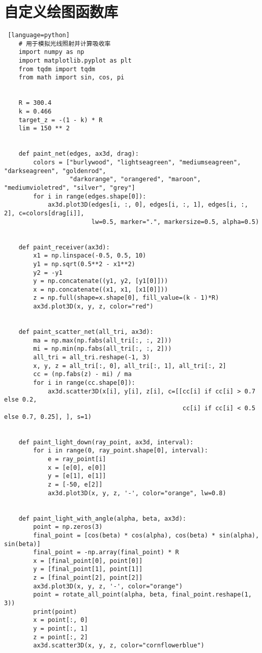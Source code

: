 \documentclass[withoutpreface,bwprint,fontset=macnew]{cumcmthesis} %
\begin{document}
\begin{appendices}
\begin{lstlisting}[language=python]
	\end{lstlisting}
	\section{自定义绘图函数库}
	\begin{lstlisting} [language=python]
	# 用于模拟光线照射并计算吸收率
	import numpy as np
	import matplotlib.pyplot as plt
	from tqdm import tqdm
	from math import sin, cos, pi
	
	
	R = 300.4
	k = 0.466
	target_z = -(1 - k) * R
	lim = 150 ** 2
	
	
	def paint_net(edges, ax3d, drag):
	    colors = ["burlywood", "lightseagreen", "mediumseagreen", "darkseagreen", "goldenrod",
	              "darkorange", "orangered", "maroon", "mediumvioletred", "silver", "grey"]
	    for i in range(edges.shape[0]):
	        ax3d.plot3D(edges[i, :, 0], edges[i, :, 1], edges[i, :, 2], c=colors[drag[i]],
	                    lw=0.5, marker=".", markersize=0.5, alpha=0.5)
	
	
	def paint_receiver(ax3d):
	    x1 = np.linspace(-0.5, 0.5, 10)
	    y1 = np.sqrt(0.5**2 - x1**2)
	    y2 = -y1
	    y = np.concatenate((y1, y2, [y1[0]]))
	    x = np.concatenate((x1, x1, [x1[0]]))
	    z = np.full(shape=x.shape[0], fill_value=(k - 1)*R)
	    ax3d.plot3D(x, y, z, color="red")
	
	
	def paint_scatter_net(all_tri, ax3d):
	    ma = np.max(np.fabs(all_tri[:, :, 2]))
	    mi = np.min(np.fabs(all_tri[:, :, 2]))
	    all_tri = all_tri.reshape(-1, 3)
	    x, y, z = all_tri[:, 0], all_tri[:, 1], all_tri[:, 2]
	    cc = (np.fabs(z) - mi) / ma
	    for i in range(cc.shape[0]):
	        ax3d.scatter3D(x[i], y[i], z[i], c=[[cc[i] if cc[i] > 0.7 else 0.2,
	                                             cc[i] if cc[i] < 0.5 else 0.7, 0.25], ], s=1)
	
	
	def paint_light_down(ray_point, ax3d, interval):
	    for i in range(0, ray_point.shape[0], interval):
	        e = ray_point[i]
	        x = [e[0], e[0]]
	        y = [e[1], e[1]]
	        z = [-50, e[2]]
	        ax3d.plot3D(x, y, z, '-', color="orange", lw=0.8)
	
	
	def paint_light_with_angle(alpha, beta, ax3d):
	    point = np.zeros(3)
	    final_point = [cos(beta) * cos(alpha), cos(beta) * sin(alpha), sin(beta)]
	    final_point = -np.array(final_point) * R
	    x = [final_point[0], point[0]]
	    y = [final_point[1], point[1]]
	    z = [final_point[2], point[2]]
	    ax3d.plot3D(x, y, z, '-', color="orange")
	    point = rotate_all_point(alpha, beta, final_point.reshape(1, 3))
	    print(point)
	    x = point[:, 0]
	    y = point[:, 1]
	    z = point[:, 2]
	    ax3d.scatter3D(x, y, z, color="cornflowerblue")
	

\end{lstlisting}
\end{appendices}
\end{document}
